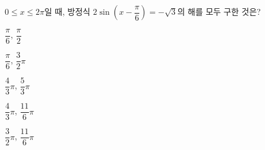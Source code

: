 $0\le x\le 2\pi$일 때, 방정식 $2\sin\left(x-\dfrac{\pi}{6}\right)=-\sqrt{3}$의 해를 모두 구한 것은?
\begin{choices32}{\rule[-3ex]{0pt}{8ex}$\dfrac{\pi}{6}$, $\dfrac{\pi}{2}$}{\rule[-3ex]{0pt}{8ex}$\dfrac{\pi}{6}$, $\dfrac{3}{2}\pi$}{\rule[-3ex]{0pt}{8ex}$\dfrac{4}{3}\pi$, $\dfrac{5}{3}\pi$}{\rule[-3ex]{0pt}{8ex}$\dfrac{4}{3}\pi$, $\dfrac{11}{6}\pi$}{\rule[-3ex]{0pt}{8ex}$\dfrac{3}{2}\pi$, $\dfrac{11}{6}\pi$}\end{choices32}
